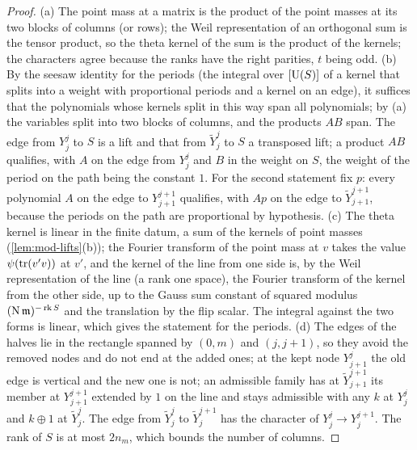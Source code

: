\begin{proof}
(a) The point mass at a matrix is the product of the point masses at its two blocks of columns (or rows); the Weil representation of an orthogonal sum is the tensor product, so the theta kernel of the sum is the product of the
kernels; the characters agree because the ranks have the right parities, $t$ being odd. (b) By the seesaw identity for the periods (the integral over $[\operatorname{U}(S)]$ of a kernel that splits into a weight with proportional periods and a
kernel on an edge), it suffices that the polynomials whose kernels split in this way span all polynomials; by (a) the variables split into two blocks of columns, and the products $AB$ span. The edge from $Y^j_j$ to $S$ is a lift and
that from $\tilde Y^j_j$ to $S$ a transposed lift; a product $AB$ qualifies, with $A$ on the edge from $Y^j_j$ and $B$ in the weight on $S$, the weight of the period on the path being the constant $1$. For the second statement fix $p$: every
polynomial $A$ on the edge to $Y^{j+1}_{j+1}$ qualifies, with $Ap$ on the edge to $\tilde Y^{j+1}_{j+1}$, because the periods on the path are proportional by hypothesis. (c) The theta kernel is linear in the finite datum, a sum of the kernels of
point masses (\cref{lem:mod-lifts}(b)); the Fourier transform of the point mass at $v$ takes the value $\psi(\operatorname{tr}(v'v))$ at $v'$, and the kernel of the line from one side is, by the Weil representation of the line (a rank one space), the
Fourier transform of the kernel from the other side, up to the Gauss sum constant of squared modulus $(\operatorname{N}\mathfrak m)^{-\operatorname{rk}S}$ and the translation by the flip scalar. The integral against the two forms is linear, which gives
the statement for the periods. (d) The edges of the halves lie in the rectangle spanned by $(0,m)$ and $(j,j+1)$, so they avoid the removed nodes and do not end at the added ones; at the kept node $Y^j_{j+1}$ the old edge is vertical and the
new one is not; an admissible family has at $\tilde Y^{j+1}_{j+1}$ its member at $Y^{j+1}_{j+1}$ extended by $1$ on the line and stays admissible with any $k$ at $Y^j_j$ and $k\oplus1$ at $\tilde Y^j_j$. The edge from $\tilde Y^j_j$ to $\tilde Y^{j+1}_j$ has the
character of $Y^j_j\to Y^{j+1}_j$. The rank of $S$ is at most $2n_m$, which bounds the number of columns.
\end{proof}

